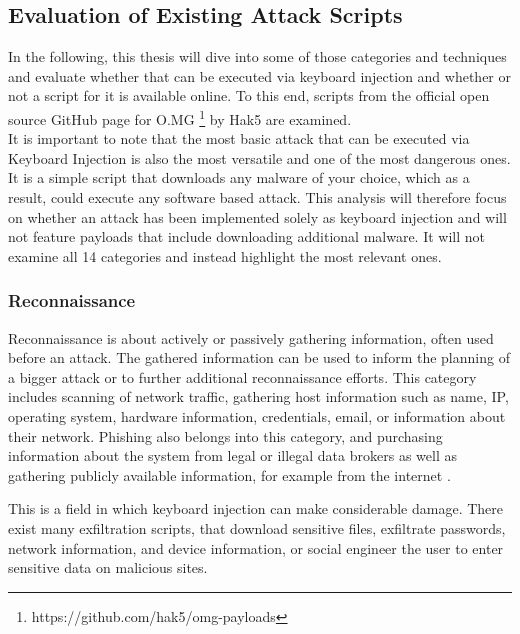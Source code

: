 \subsection{Evaluation of Existing Attack Scripts}

In the following, this thesis will dive into some of those categories and techniques and evaluate whether that can be executed via keyboard injection and whether or not a script for it is available online. To this end, scripts from the official open source GitHub page for O.MG \footnote{https://github.com/hak5/omg-payloads} by Hak5 are examined. \\
It is important to note that the most basic attack that can be executed via Keyboard Injection is also the most versatile and one of the most dangerous ones. It is a simple script that downloads any malware of your choice, which as a result, could execute any software based attack.  
This analysis will therefore focus on whether an attack has been implemented solely as keyboard injection and will not feature payloads that include downloading additional malware. It will not examine all 14 categories and instead highlight the most relevant ones. 

\subsubsection{Reconnaissance}

Reconnaissance is about actively or passively gathering information, often used before an attack. The gathered information can be used to inform the planning of a bigger attack or to further additional reconnaissance efforts. This category includes scanning of network traffic, gathering host information such as name, IP, operating system, hardware information, credentials, email, or information about their network. Phishing also belongs into this category, and purchasing information about the system from legal or illegal data brokers as well as gathering publicly available information, for example from the internet \cite{MITREATTCK}.

This is a field in which keyboard injection can make considerable damage. There exist many exfiltration scripts, that download sensitive files, exfiltrate passwords, network information, and device information, or social engineer the user to enter sensitive data on malicious sites. 

